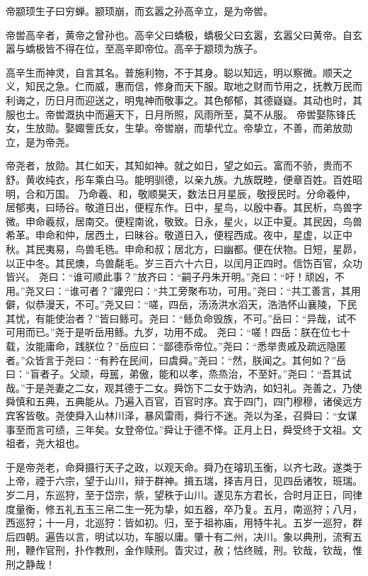 \documentclass[UTF8,12pt,AutoFakeBold,fontset=fandol]{ctexart}
\begin{document}
	帝颛顼生子曰穷蝉。颛顼崩，而玄嚣之孙高辛立，是为帝喾。
	\par
	帝喾高辛者，黄帝之曾孙也。高辛父曰蟜极，蟜极父曰玄嚣，玄嚣父曰黄帝。自玄嚣与蟜极皆不得在位，至高辛即帝位。高辛于颛顼为族子。
	\par
	高辛生而神灵，自言其名。普施利物，不于其身。聪以知远，明以察微。顺天之义，知民之急。仁而威，惠而信，修身而天下服。取地之财而节用之，抚教万民而利诲之，历日月而迎送之，明鬼神而敬事之。其色郁郁，其德嶷嶷。其动也时，其服也士。帝喾溉执中而遍天下，日月所照，风雨所至，莫不从服。
	帝喾娶陈锋氏女，生放勋。娶娵訾氏女，生挚。帝喾崩，而挚代立。帝挚立，不善，而弟放勋立，是为帝尧。
	\par
	帝尧者，放勋。其仁如天，其知如神。就之如日，望之如云。富而不骄，贵而不舒。黄收纯衣，彤车乘白马。能明驯德，以亲九族。九族既睦，便章百姓。百姓昭明，合和万国。
	乃命羲、和，敬顺昊天，数法日月星辰，敬授民时。分命羲仲，居郁夷，曰旸谷。敬道日出，便程东作。日中，星鸟，以殷中春。其民析，鸟兽字微。申命羲叔，居南交。便程南讹，敬致。日永，星火，以正中夏。其民因，鸟兽希革。申命和仲，居西土，曰昧谷。敬道日入，便程西成。夜中，星虚，以正中秋。其民夷易，鸟兽毛毨。申命和叔；居北方，曰幽都。便在伏物。日短，星昴，以正中冬。其民燠，鸟兽氄毛。岁三百六十六日，以闰月正四时。信饬百官，众功皆兴。
	尧曰：“谁可顺此事？”放齐曰：“嗣子丹朱开明。”尧曰：“吁！顽凶，不用。”尧又曰：“谁可者？”讙兜曰：“共工旁聚布功，可用。”尧曰：“共工善言，其用僻，似恭漫天，不可。”尧又曰：“嗟，四岳，汤汤洪水滔天，浩浩怀山襄陵，下民其忧，有能使治者？”皆曰鲧可。尧曰：“鲧负命毁族，不可。”岳曰：“异哉，试不可用而已。”尧于是听岳用鲧。九岁，功用不成。
	尧曰：“嗟！四岳：朕在位七十载，汝能庸命，践朕位？”岳应曰：“鄙德忝帝位。”尧曰：“悉举贵戚及疏远隐匿者。”众皆言于尧曰：“有矜在民间，曰虞舜。”尧曰：“然，朕闻之。其何如？”岳曰：“盲者子。父顽，母嚚，弟傲，能和以孝，烝烝治，不至奸。”尧曰：“吾其试哉。”于是尧妻之二女，观其德于二女。舜饬下二女于妫汭，如妇礼。尧善之，乃使舜慎和五典，五典能从。乃遍入百官，百官时序。宾于四门，四门穆穆，诸侯远方宾客皆敬。尧使舜入山林川泽，暴风雷雨，舜行不迷。尧以为圣，召舜曰：“女谋事至而言可绩，三年矣。女登帝位。”舜让于德不怿。正月上日，舜受终于文祖。文祖者，尧大祖也。
	\par
	于是帝尧老，命舜摄行天子之政，以观天命。舜乃在璿玑玉衡，以齐七政。遂类于上帝，禋于六宗，望于山川，辩于群神。揖五瑞，择吉月日，见四岳诸牧，班瑞。岁二月，东巡狩，至于岱宗，祡，望秩于山川。遂见东方君长，合时月正日，同律度量衡，修五礼五玉三帛二生一死为挚，如五器，卒乃复。五月，南巡狩；八月，西巡狩；十一月，北巡狩：皆如初。归，至于祖祢庙，用特牛礼。五岁一巡狩，群后四朝。遍告以言，明试以功，车服以庸。肇十有二州，决川。象以典刑，流宥五刑，鞭作官刑，扑作教刑，金作赎刑。眚灾过，赦；怙终贼，刑。钦哉，钦哉，惟刑之静哉！
\end{document}

